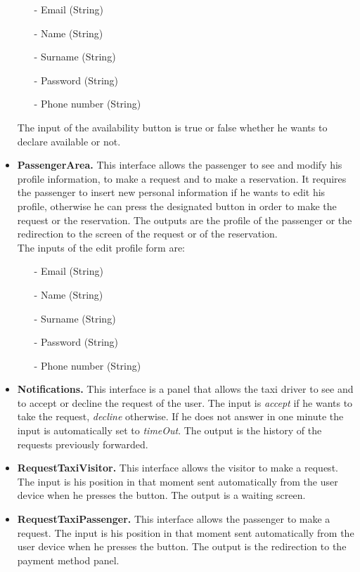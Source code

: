 \begin{itemize}
		\begin{itemize} 
			\item[-] Email (String)
			\item[-] Name (String)
			\item[-] Surname (String)
			\item[-] Password (String)
			\item[-] Phone number (String)
		\end{itemize}
		The input of the availability button is true or false whether he wants to declare available or not.
	\item \textbf{PassengerArea.}
		This interface allows the passenger to see and modify his profile information, to make a request and to make a reservation. It requires the passenger to insert new personal information if he wants to edit his profile, otherwise he can press the designated button in order to make the request or the reservation. The outputs are the profile of the passenger or the redirection to the screen of the request or of the reservation.\\ The inputs of the edit profile form are:
		\begin{itemize} 
			\item[-] Email (String)
			\item[-] Name (String)
			\item[-] Surname (String)
			\item[-] Password (String)
			\item[-] Phone number (String)
		\end{itemize}
	\item \textbf{Notifications.}
		This interface is a panel that allows the taxi driver to see and to accept or decline the request of the user. The input is \textit{accept} if he wants to take the request, \textit{decline} otherwise. If he does not answer in one minute the input is automatically set to \textit{timeOut}. The output is the history of the requests previously forwarded.
	\item \textbf{RequestTaxiVisitor.}
		This interface allows the visitor to make a request. The input is his position in that moment sent automatically from the user device when he presses the button. The output is a waiting screen.
	\item \textbf{RequestTaxiPassenger.}
		This interface allows the passenger to make a request. The input is his position in that moment sent automatically from the user device when he presses the button. The output is the redirection to the payment method panel. 

\end{itemize}
